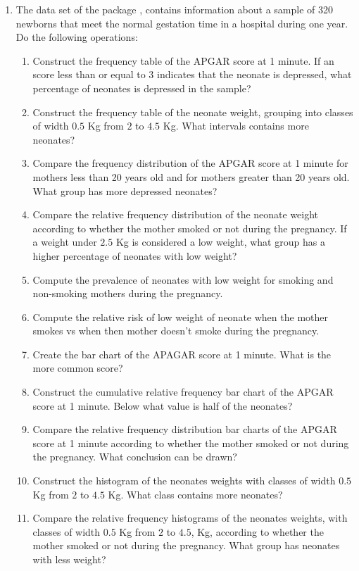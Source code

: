 \begin{enumerate}[leftmargin=*]
\item The data set  of the package , contains information about a
sample of 320 newborns that meet the normal gestation time in a hospital during one year.
Do the following operations:
\begin{enumerate}
\item Construct the frequency table of the APGAR score at 1 minute.
If an score less than or equal to 3 indicates that the neonate is depressed, what percentage of neonates is depressed in
the sample?
\item Construct the frequency table of the neonate weight, grouping into classes of width $0.5$ Kg from $2$
to $4.5$ Kg. What intervals contains more neonates?
\item Compare the frequency distribution of the APGAR score at 1 minute for mothers less than 20 years old
and for mothers greater than 20 years old. What group has more depressed neonates?
\item Compare the relative frequency distribution of the neonate weight according to whether the mother smoked or
not during the pregnancy.
If a weight under $2.5$ Kg is considered a low weight, what group has a higher percentage of neonates with low weight?
\item Compute the prevalence of neonates with low weight for smoking and non-smoking mothers during the pregnancy. 
\item Compute the relative risk of low weight of neonate when the mother smokes vs when then mother doesn't smoke
during the pregnancy.
\item Create the bar chart of the APAGAR score at 1 minute.
What is the more common score?
\item Construct the cumulative relative frequency bar chart of the APGAR score at 1 minute.
Below what value is half of the neonates?
\item Compare the relative frequency distribution bar charts of the APGAR score at 1 minute according to whether the mother smoked or
not during the pregnancy. 
What conclusion can be drawn?
\item Construct the histogram of the neonates weights with classes of width $0.5$ Kg from $2$ to $4.5$ Kg.
What class contains more neonates?
\item Compare the relative frequency histograms of the neonates weights, with classes of width $0.5$ Kg from $2$ to
$4.5$, Kg, according to whether the mother smoked or not during the pregnancy. 
What group has neonates with less weight?

\end{enumerate}
\end{enumerate}
